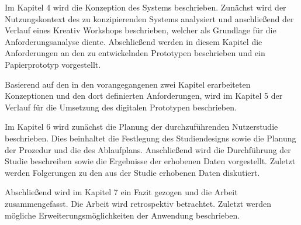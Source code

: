 Im Kapitel 4 wird die Konzeption des Systems beschrieben. Zunächst wird der Nutzungskontext des zu konzipierenden Systems analysiert und 
anschließend der Verlauf eines Kreativ Workshops beschrieben, welcher als Grundlage für die Anforderungsanalyse diente. Abschließend werden in diesem Kapitel 
die Anforderungen an den zu entwickelnden Prototypen beschrieben und ein Papierprototyp vorgestellt. 

Basierend auf den in den vorangegangenen zwei Kapitel erarbeiteten Konzeptionen und den dort definierten Anforderungen, wird im Kapitel 5 der Verlauf für die 
Umsetzung des digitalen Prototypen beschrieben.      

Im Kapitel 6 wird zunächst die Planung der durchzuführenden Nutzerstudie beschrieben. Dies beinhaltet die Festlegung des Studiendesigns sowie die Planung der Prozedur und die des Ablaufplans. 
Anschließend wird die Durchführung der Studie beschreiben sowie die Ergebnisse der erhobenen Daten vorgestellt. Zuletzt werden Folgerungen zu den aus der Studie erhobenen Daten diskutiert.

Abschließend wird im Kapitel 7 ein Fazit gezogen und die Arbeit zusammengefasst. Die Arbeit wird retrospektiv betrachtet. 
Zuletzt werden mögliche Erweiterungsmöglichkeiten der Anwendung beschrieben. 